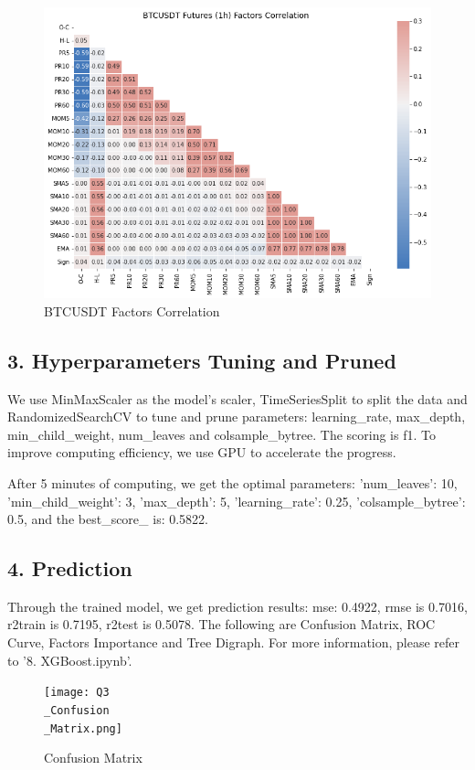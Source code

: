 \documentclass[UTF8]{ctexart}
\begin{document}
\begin{figure}[H]
	\centerline{\includegraphics[width=1\textwidth]{Q3_Corr.png}}
	\caption{BTCUSDT Factors Correlation}
\end{figure}

\subsection*{3. Hyperparameters Tuning and Pruned}

We use MinMaxScaler as the model's scaler, TimeSeriesSplit to split the data and RandomizedSearchCV to tune and prune parameters: learning\_rate, max\_depth, min\_child\_weight, num\_leaves and colsample\_bytree. The scoring is f1. To improve computing efficiency, we use GPU to accelerate the progress.

After 5 minutes of computing, we get the optimal parameters: 'num\_leaves': 10, 'min\_child\_weight': 3, 'max\_depth': 5, 'learning\_rate': 0.25, 'colsample\_bytree': 0.5, and the best\_score\_ is: 0.5822.

\subsection*{4. Prediction}

Through the trained model, we get prediction results: mse: 0.4922, rmse is 0.7016, r2train is 0.7195, r2test is 0.5078. The following are Confusion Matrix, ROC Curve, Factors Importance and Tree Digraph. For more information, please refer to '8. XGBoost.ipynb'.

\begin{figure}[H]
	\centerline{\texttt{[image: Q3\\\_Confusion\\\_Matrix.png]}}
	\caption{Confusion Matrix}
\end{figure}
\end{document}
